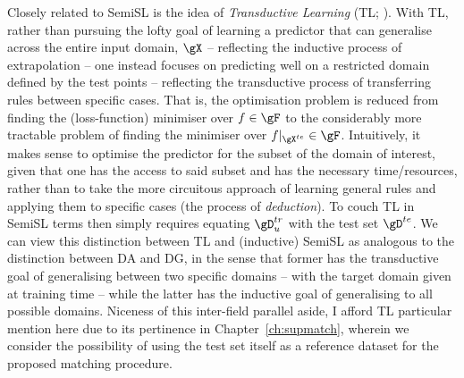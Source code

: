 %
Closely related to \ac{SemiSL} is the idea of \emph{Transductive Learning} (TL;
\citealp{gammerman1998learning}).
%
With TL, rather than pursuing the lofty goal of learning a predictor that can generalise across the
entire input domain, \( \gX \) -- reflecting the inductive process of extrapolation -- one instead
focuses on predicting well on a restricted domain defined by the test points -- reflecting the
transductive process of transferring rules between specific cases. 
%
%
That is, the optimisation problem is reduced from finding the (loss-function) minimiser over \(f
\in \gF \)  to the considerably more tractable problem of finding the minimiser over \(
f|_{\gX^{te}} \in \gF \).
%
Intuitively, it makes sense to optimise the predictor for the subset of the domain of interest,
given that one has the access to said subset and has the necessary time/resources, rather than to
take the more circuitous approach of learning general rules and applying them to specific cases
(the process of \emph{deduction}).
%
To couch TL in \ac{SemiSL} terms then simply requires equating \(\gD^{tr}_u \) with the test set
\(\gD^{te} \).
%
We can view this distinction between TL and (inductive) \ac{SemiSL} as analogous to the distinction
between \ac{DA} and \ac{DG}, in the sense that former has the transductive goal of generalising
between two specific domains -- with the target domain given at training time -- while the latter
has the inductive goal of generalising to all possible domains.
%
Niceness of this inter-field parallel aside, I afford TL particular mention here due to its
pertinence in Chapter~\ref{ch:supmatch}, wherein we consider the possibility of using the test set
itself as a reference dataset for the proposed matching procedure.


